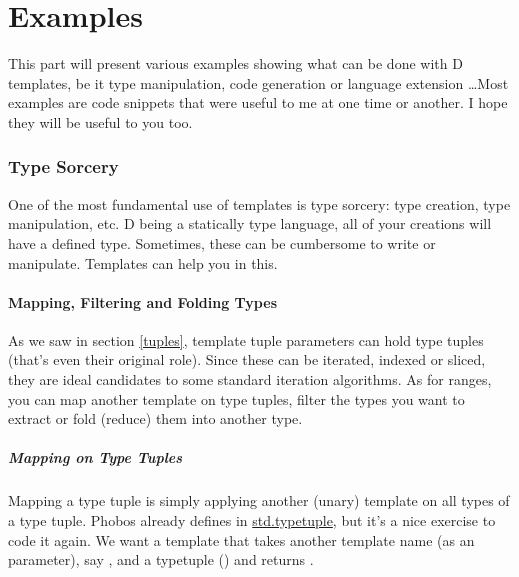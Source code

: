 \newpage
\part{Examples}\label{examples}

This part will present various examples showing what can be done with D templates, be it type manipulation, code generation or language extension \ldots Most examples are code snippets that were useful to me at one time or another. I hope they will be useful to you too.


\section{Type Sorcery}

One of the most fundamental use of templates is type sorcery: type creation, type manipulation, etc. D being a statically type language, all of your creations will have a defined type. Sometimes, these can be cumbersome to write or manipulate. Templates can help you in this.

\subsection{Mapping, Filtering and Folding Types}

As we saw in section \ref{tuples}, template tuple parameters can hold type tuples (that's even their original role). Since these can be iterated, indexed or sliced, they are ideal candidates to some standard iteration algorithms. As for ranges, you can map another template on type tuples, filter the types you want to extract or fold (reduce) them into another type.


\subsubsection{Mapping on Type Tuples}

Mapping a type tuple is simply applying another (unary) template on all types of a type tuple. Phobos already defines  in \href{www.d-programming-language.org/phobos/std_typetuple.html#staticMap}{std.typetuple}, but it's a nice exercise to code it again. We want a template that takes another template name (as an  parameter), say , and a typetuple () and returns .

